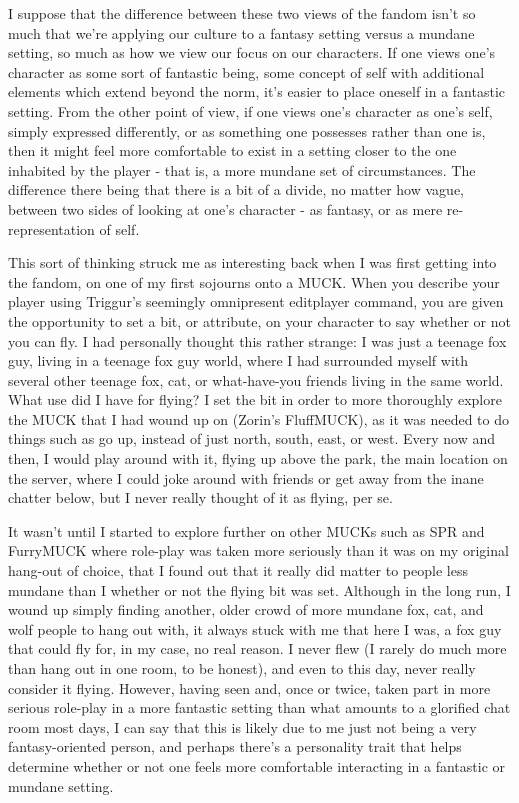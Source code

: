 I suppose that the difference between these two views of the fandom isn't so much that we're applying our culture to a fantasy setting versus a mundane setting, so much as how we view our focus on our characters. If one views one's character as some sort of fantastic being, some concept of self with additional elements which extend beyond the norm, it's easier to place oneself in a fantastic setting. From the other point of view, if one views one's character as one's self, simply expressed differently, or as something one possesses rather than one is, then it might feel more comfortable to exist in a setting closer to the one inhabited by the player - that is, a more mundane set of circumstances. The difference there being that there is a bit of a divide, no matter how vague, between two sides of looking at one's character - as fantasy, or as mere re-representation of self.

This sort of thinking struck me as interesting back when I was first getting into the fandom, on one of my first sojourns onto a MUCK. When you describe your player using Triggur's seemingly omnipresent editplayer command, you are given the opportunity to set a bit, or attribute, on your character to say whether or not you can fly. I had personally thought this rather strange: I was just a teenage fox guy, living in a teenage fox guy world, where I had surrounded myself with several other teenage fox, cat, or what-have-you friends living in the same world. What use did I have for flying? I set the bit in order to more thoroughly explore the MUCK that I had wound up on (Zorin's FluffMUCK), as it was needed to do things such as go up, instead of just north, south, east, or west. Every now and then, I would play around with it, flying up above the park, the main location on the server, where I could joke around with friends or get away from the inane chatter below, but I never really thought of it as flying, per se.

It wasn't until I started to explore further on other MUCKs such as SPR and FurryMUCK where role-play was taken more seriously than it was on my original hang-out of choice, that I found out that it really did matter to people less mundane than I whether or not the flying bit was set. Although in the long run, I wound up simply finding another, older crowd of more mundane fox, cat, and wolf people to hang out with, it always stuck with me that here I was, a fox guy that could fly for, in my case, no real reason. I never flew (I rarely do much more than hang out in one room, to be honest), and even to this day, never really consider it flying. However, having seen and, once or twice, taken part in more serious role-play in a more fantastic setting than what amounts to a glorified chat room most days, I can say that this is likely due to me just not being a very fantasy-oriented person, and perhaps there's a personality trait that helps determine whether or not one feels more comfortable interacting in a fantastic or mundane setting.

